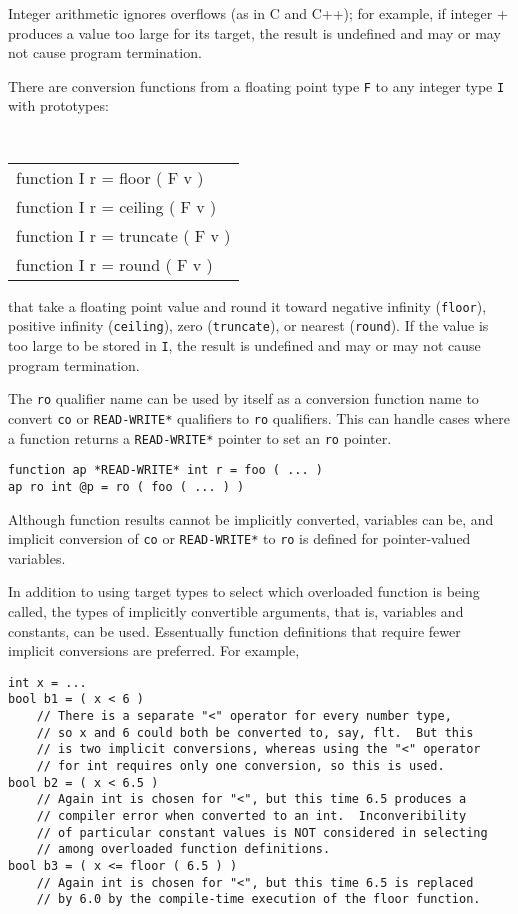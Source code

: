 \documentclass[12pt]{article}
\newenvironment{indpar}[1][0.3in]%
	{\begin{list}{}%
		     {\setlength{\itemsep}{0in}%
		      \setlength{\topsep}{0in}%
		      \setlength{\parsep}{1ex}%
		      \setlength{\labelwidth}{#1}%
		      \setlength{\leftmargin}{#1}%
		      \addtolength{\leftmargin}{\labelsep}}%
	 \item}%
	{\end{list}}
\begin{document}
Integer arithmetic ignores overflows (as in C and C++); for example,
if integer + produces a value too large for its
target, the result is undefined and may or may not cause program
termination.

There are conversion functions from a floating
point type {\tt F} to any integer type {\tt I} with prototypes:
\begin{center} \tt
\begin{tabular}{l}
function I r = floor ( F v ) \\
function I r = ceiling ( F v ) \\
function I r = truncate  ( F v ) \\
function I r = round ( F v ) \\
\end{tabular}
\end{center}
that take a floating point value and round it toward
negative infinity ({\tt floor}),
positive infinity ({\tt ceiling}),
zero ({\tt truncate}),
or nearest ({\tt round}).  If the value is too large to be stored
in {\tt I}, the result is undefined and may or may not cause
program termination.

The {\tt ro} qualifier name can be used by itself as a
conversion function name to convert
{\tt co} or {\tt *READ-WRITE*} qualifiers to {\tt ro} qualifiers.
This can handle cases where a function returns a {\tt *READ-WRITE*}
pointer to set an {\tt ro} pointer.

\begin{indpar}\begin{verbatim}
function ap *READ-WRITE* int r = foo ( ... )
ap ro int @p = ro ( foo ( ... ) )
\end{verbatim}\end{indpar}

Although function results cannot be implicitly converted, variables
can be, and implicit conversion of {\tt co} or {\tt *READ-WRITE*} to
{\tt ro} is defined for pointer-valued variables.

In addition to using target types to select which overloaded
function is being called, the types of implicitly convertible
arguments, that is, variables and constants, can be used.
Essentually function definitions that require fewer implicit
conversions are preferred.  For example,

\begin{indpar}\begin{verbatim}
int x = ...
bool b1 = ( x < 6 )
    // There is a separate "<" operator for every number type,
    // so x and 6 could both be converted to, say, flt.  But this
    // is two implicit conversions, whereas using the "<" operator
    // for int requires only one conversion, so this is used.
bool b2 = ( x < 6.5 )
    // Again int is chosen for "<", but this time 6.5 produces a
    // compiler error when converted to an int.  Inconveribility
    // of particular constant values is NOT considered in selecting
    // among overloaded function definitions.
bool b3 = ( x <= floor ( 6.5 ) )
    // Again int is chosen for "<", but this time 6.5 is replaced
    // by 6.0 by the compile-time execution of the floor function.
\end{verbatim}\end{indpar}
\end{document}
